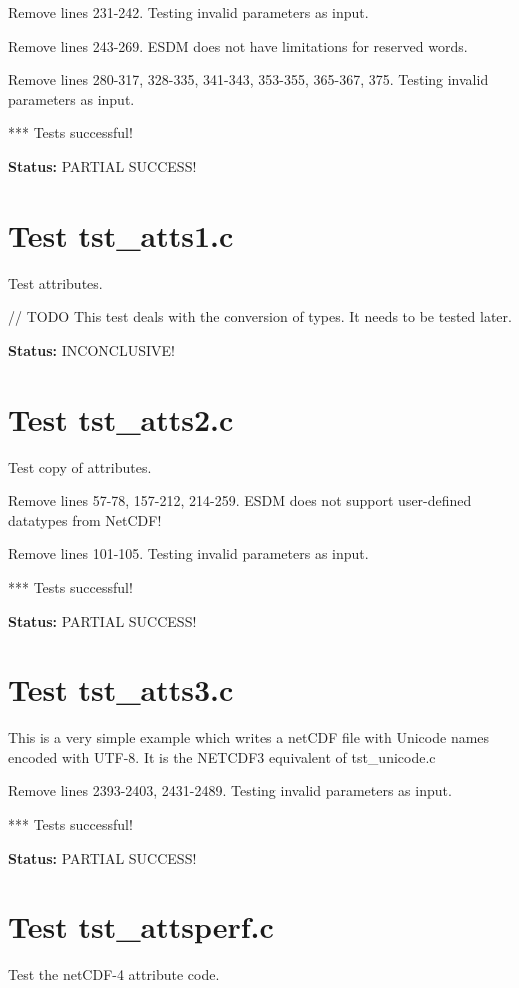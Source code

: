Remove lines 231-242. Testing invalid parameters as input.

Remove lines 243-269. ESDM does not have limitations for reserved words.

Remove lines 280-317, 328-335, 341-343, 353-355, 365-367, 375. Testing invalid parameters as input.

*** Tests successful!

{\bf \large Status: } PARTIAL SUCCESS!

\section{Test tst\_atts1.c}

Test attributes.

// TODO This test deals with the conversion of types. It needs to be tested later.

{\bf \large Status: } INCONCLUSIVE!

\section{Test tst\_atts2.c}

Test copy of attributes.

Remove lines 57-78, 157-212, 214-259. ESDM does not support user-defined datatypes from NetCDF!

Remove lines 101-105. Testing invalid parameters as input.

*** Tests successful!

{\bf \large Status: } PARTIAL SUCCESS!

\section{Test tst\_atts3.c}

This is a very simple example which writes a netCDF file with
Unicode names encoded with UTF-8. It is the NETCDF3 equivalent
of tst\_unicode.c

Remove lines 2393-2403, 2431-2489. Testing invalid parameters as input.

*** Tests successful!

{\bf \large Status: } PARTIAL SUCCESS!

\section{Test tst\_attsperf.c}

Test the netCDF-4 attribute code.

